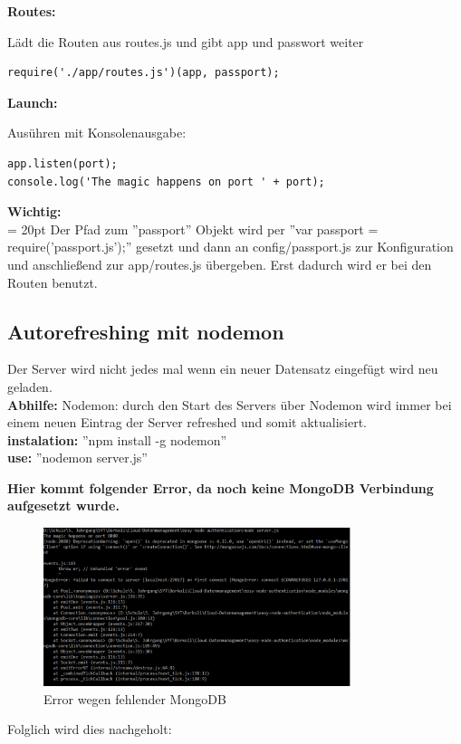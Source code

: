 \leftskip=0pt
\textbf{Routes:}

\leftskip=20pt
Lädt die Routen aus routes.js und gibt app und passwort weiter
\begin{lstlisting}
require('./app/routes.js')(app, passport);
\end{lstlisting}

\leftskip=0pt
\textbf{Launch:}

\leftskip=20pt
Ausühren mit Konsolenausgabe:
\begin{lstlisting}
app.listen(port);
console.log('The magic happens on port ' + port);
\end{lstlisting}

\leftskip=0pt
\textbf{Wichtig:}\\

\leftskip = 20pt
Der Pfad zum ''passport'' Objekt  wird per ''var passport = require('passport.js');'' gesetzt und dann an config/passport.js zur Konfiguration und anschließend zur app/routes.js übergeben. Erst dadurch wird er bei den Routen benutzt.

\leftskip=0pt
\subsection{Autorefreshing mit nodemon}
	Der Server wird nicht jedes mal wenn ein neuer Datensatz eingefügt wird neu geladen. \\
	\textbf{Abhilfe:} Nodemon: durch den Start des Servers über Nodemon wird immer bei einem neuen Eintrag der Server refreshed und somit aktualisiert.\\
	\textbf{instalation:} ''npm install -g nodemon''\\
	\textbf{use:} ''nodemon server.js''
	
	\leftskip=0pt
	\textbf{Hier kommt folgender Error, da noch keine MongoDB Verbindung aufgesetzt wurde.}
	
\begin{figure}[!h] 
\centering
\includegraphics[width=0.8\textwidth]{images/noMongoDB.PNG}
\caption{Error wegen fehlender MongoDB}
\label{fig:Error wegen fehender MongoDB}
\end{figure}
Folglich wird dies nachgeholt:

